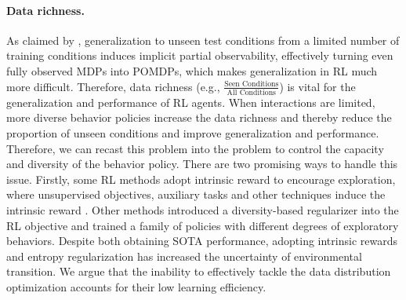 \paragraph{Data richness.} As claimed by \citep{ghosh2021generalization},  generalization to unseen test conditions from a limited number of training conditions induces implicit partial observability, effectively turning even fully observed MDPs into POMDPs, which makes generalization in RL much more difficult. Therefore, data richness (e.g., $\frac{\text{Seen Conditions}}{\text{All Conditions}}$) is vital for the generalization and performance of RL agents.  When interactions are limited, more diverse behavior policies increase the data richness and thereby reduce the proportion of unseen conditions  and  improve generalization and performance.  Therefore, we can recast this problem into the problem to control the  capacity and diversity  of the behavior policy. There are two promising ways to handle this issue. 
Firstly, some RL methods adopt intrinsic reward to encourage exploration, where unsupervised objectives, auxiliary tasks and other techniques induce the intrinsic reward \citep{icm}.
Other methods \citep{agent57} introduced a diversity-based regularizer into the RL objective and trained a family of policies with different degrees of exploratory behaviors.   Despite both obtaining SOTA performance, adopting intrinsic rewards and entropy regularization has increased the uncertainty of environmental transition. We argue that the inability to effectively tackle the  data distribution optimization accounts for their low learning efficiency. 
 




